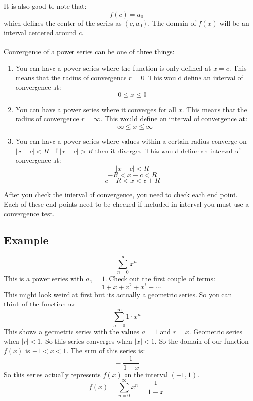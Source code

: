 \documentclass{article}
\begin{document}
    It is also good to note that:
    \[f(c) = a_0\]
    which defines the center of the series as \((c, a_0)\).
    The domain of \(f(x)\) will be an interval centered around \(c\).\\
    \\
    Convergence of a power series can be one of three things:
    \begin{enumerate}
        \item You can have a power series where the function is only defined at \(x = c\).
        This means that the radius of convergence \(r = 0\).
        This would define an interval of convergence at:
        \[0 \leq x \leq 0\]
        \item You can have a power series where it converges for all \(x\).
        This means that the radius of convergence \(r = \infty\).
        This would define an interval of convergence at:
        \[- \infty \leq x \leq \infty\]
        \item You can have a power series where values within a certain radius converge on
        \(|x-c| < R\).
        If \(|x-c| > R\) then it diverges.
        This would define an interval of convergence at:
        \[|x-c| < R\]
        \[-R < x - c < R\]
        \[c - R < x < c + R\]
    \end{enumerate}
    After you check the interval of convergence, you need to check each end point.
    Each of these end points need to be checked if included in interval you must use a convergence test.
    
    \subsection{Example}
        \[\sum_{n=0}^{\infty} x^n \]
        This is a power series with \(a_n = 1\).
        Check out the first couple of terms:
        \[= 1 + x + x^2 + x^3 + \cdots\]
        This might look weird at first but its actually a geometric series.
        So you can think of the function as:
        \[\sum_{n=0}^{\infty} 1 \cdot x^n\]
        This shows a geometric series with the values \(a = 1\) and \(r = x\).
        Geometric series when \(|r| < 1\).
        So this series converges when \(|x| < 1\).
        So the domain of our function \(f(x)\) is \(-1 < x < 1\).
        The sum of this series is:
        \[= \frac{1}{1-x}\]
        So this series actually represents \(f(x)\) on the interval \((-1, 1)\).
        \[f(x) = \sum_{n=0}^{\infty} x^n = \frac{1}{1-x}\] 
        
\end{document}

